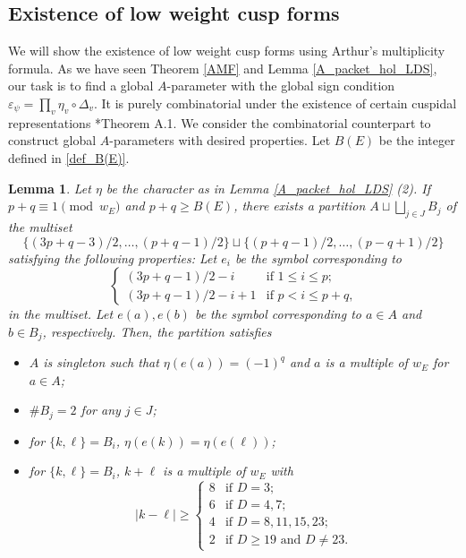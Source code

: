 \documentclass[11pt]{amsart}
\theoremstyle{plain}
\newtheorem{lem}[thm]{Lemma}
\theoremstyle{definition}
\numberwithin{equation}{section}
\newcommand{\vep}{\varepsilon}
\begin{document}
\subsection{Existence of low weight cusp forms}
We will show the existence of low weight cusp forms using Arthur's multiplicity formula.
As we have seen Theorem \ref{AMF} and Lemma \ref{A_packet_hol_LDS}, our task is to find a global $A$-parameter with the global sign condition $\vep_\psi = \prod_{v} \eta_v \circ \Delta_v$.
It is purely combinatorial under the existence of certain cuspidal representations \cite{2025_HMY_Kodaira_dimension_ball_quotients}*{Theorem A.1}.
We consider the combinatorial counterpart to construct global $A$-parameters with desired properties.
Let $B(E)$ be the integer defined in \eqref{def_B(E)}.
\begin{lem}\label{lem_partition}
    Let $\eta$ be the character as in Lemma \ref{A_packet_hol_LDS} (2).
    If $p+q\equiv 1 \pmod{w_E}$ and $p+q \geq B(E)$, there exists a partition $A\sqcup \bigsqcup_{j \in J} B_j$ of the multiset 
    \[
    \{(3p+q-3)/2,\ldots,(p+q-1)/2\} \sqcup \{(p+q-1)/2,\ldots,(p-q+1)/2\}
    \]
    satisfying the following properties:
    Let $e_i$ be the symbol corresponding to 
    \[
    \begin{cases}
        (3p+q-1)/2-i & \text{if $1 \leq i \leq p$;}\\
        (3p+q-1)/2-i + 1 & \text{if $p<i \leq p+q$,}
    \end{cases}
    \]
    in the multiset.
    Let $e(a),e(b)$ be the symbol corresponding to $a \in A$ and $b \in B_j$, respectively.
    Then, the partition satisfies
    \begin{itemize}
        \item $A$ is singleton such that $\eta(e(a)) = (-1)^q$ and $a$ is a multiple of $w_E$ for $a \in A$;
        \item $\#B_j = 2$ for any $j \in J$;
        \item for $\{k,\ell\} = B_i$, $\eta(e(k)) = \eta(e(\ell))$;
        \item for $\{k,\ell\} = B_i$, $k+\ell$ is a multiple of $w_E$ with
        \[
        |k-\ell| \geq \begin{cases}
            8 & \text{if $D = 3$;}\\
            6 & \text{if $D=4, 7$;}\\
            4 & \text{if $D=8,11,15,23$;}\\
            2 & \text{if $D \geq 19$ and $D \neq 23$.}
        \end{cases}
        \]
    \end{itemize}
\end{lem}
\end{document}
